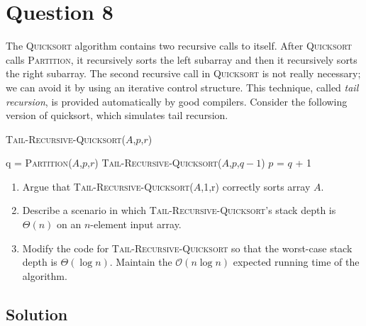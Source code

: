 
\section*{Question 8}
The \textsc{Quicksort} algorithm contains two recursive calls to itself. After \textsc{Quicksort} calls \textsc{Partition}, it recursively sorts the left subarray and then it recursively sorts the right subarray. The second recursive call in \textsc{Quicksort} is not really necessary; we can avoid it by using an iterative control structure. This technique, called \textit{tail recursion}, is provided automatically by good compilers. Consider the following version of quicksort, which simulates tail recursion.

\begin{algorithm}[H]
\caption{\textsc{Tail-Recursive-Quicksort($A$,$p$,$r$)}}
\begin{algorithmic}[1]
\State q = \textsc{Partition}($A$,$p$,$r$)
\State \textsc{Tail-Recursive-Quicksort($A$,$p$,$q-1$)}
\State $p$ = $q$ + 1
\EndWhile
\end{algorithmic}
\end{algorithm}

\begin{enumerate}[label=(\alph*)]
\item Argue that \textsc{Tail-Recursive-Quicksort}($A$,1,r) correctly sorts array $A$.

\item Describe a scenario in which \textsc{Tail-Recursive-Quicksort}'s stack depth is $\Theta(n)$ on an $n$-element input array.

\item Modify the code for \textsc{Tail-Recursive-Quicksort} so that the worst-case stack depth is $\Theta(\log n)$. Maintain the $\mathcal{O}(n\log n)$ expected running time of the algorithm.
\end{enumerate}

\subsection*{Solution}

